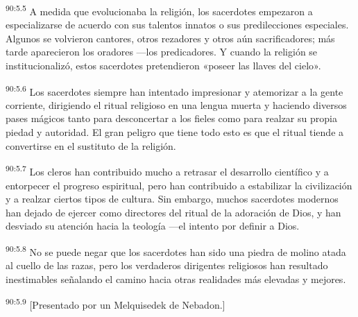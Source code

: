 \par
\textsuperscript{90:5.5} A medida que evolucionaba la religión, los sacerdotes empezaron a especializarse de acuerdo con sus talentos innatos o sus predilecciones especiales. Algunos se volvieron cantores, otros rezadores y otros aún sacrificadores; más tarde aparecieron los oradores ---los predicadores. Y cuando la religión se institucionalizó, estos sacerdotes pretendieron «poseer las llaves del cielo».

\par
\textsuperscript{90:5.6} Los sacerdotes siempre han intentado impresionar y atemorizar a la gente corriente, dirigiendo el ritual religioso en una lengua muerta y haciendo diversos pases mágicos tanto para desconcertar a los fieles como para realzar su propia piedad y autoridad. El gran peligro que tiene todo esto es que el ritual tiende a convertirse en el sustituto de la religión.

\par
\textsuperscript{90:5.7} Los cleros han contribuido mucho a retrasar el desarrollo científico y a entorpecer el progreso espiritual, pero han contribuido a estabilizar la civilización y a realzar ciertos tipos de cultura. Sin embargo, muchos sacerdotes modernos han dejado de ejercer como directores del ritual de la adoración de Dios, y han desviado su atención hacia la teología ---el intento por definir a Dios.

\par
\textsuperscript{90:5.8} No se puede negar que los sacerdotes han sido una piedra de molino atada al cuello de las razas, pero los verdaderos dirigentes religiosos han resultado inestimables señalando el camino hacia otras realidades más elevadas y mejores.

\par
\textsuperscript{90:5.9} [Presentado por un Melquisedek de Nebadon.]